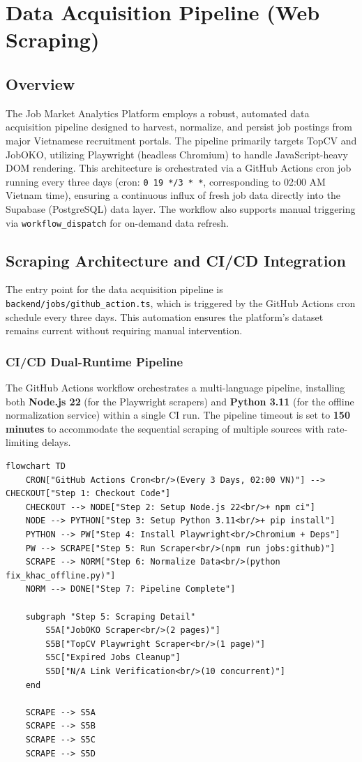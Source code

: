 \chapter{Data Acquisition Pipeline (Web Scraping)}

\section{Overview}
The Job Market Analytics Platform employs a robust, automated data acquisition pipeline designed to harvest, normalize, and persist job postings from major Vietnamese recruitment portals. The pipeline primarily targets TopCV and JobOKO, utilizing Playwright (headless Chromium) to handle JavaScript-heavy DOM rendering. This architecture is orchestrated via a GitHub Actions cron job running every three days (cron: \texttt{0 19 */3 * *}, corresponding to 02:00 AM Vietnam time), ensuring a continuous influx of fresh job data directly into the Supabase (PostgreSQL) data layer. The workflow also supports manual triggering via \texttt{workflow\_dispatch} for on-demand data refresh.

\section{Scraping Architecture and CI/CD Integration}
The entry point for the data acquisition pipeline is \texttt{backend/jobs/github\_action.ts}, which is triggered by the GitHub Actions cron schedule every three days. This automation ensures the platform's dataset remains current without requiring manual intervention.

\subsection{CI/CD Dual-Runtime Pipeline}
The GitHub Actions workflow orchestrates a multi-language pipeline, installing both \textbf{Node.js 22} (for the Playwright scrapers) and \textbf{Python 3.11} (for the offline normalization service) within a single CI run. The pipeline timeout is set to \textbf{150 minutes} to accommodate the sequential scraping of multiple sources with rate-limiting delays.

\begin{verbatim}
flowchart TD
    CRON["GitHub Actions Cron<br/>(Every 3 Days, 02:00 VN)"] --> CHECKOUT["Step 1: Checkout Code"]
    CHECKOUT --> NODE["Step 2: Setup Node.js 22<br/>+ npm ci"]
    NODE --> PYTHON["Step 3: Setup Python 3.11<br/>+ pip install"]
    PYTHON --> PW["Step 4: Install Playwright<br/>Chromium + Deps"]
    PW --> SCRAPE["Step 5: Run Scraper<br/>(npm run jobs:github)"]
    SCRAPE --> NORM["Step 6: Normalize Data<br/>(python fix_khac_offline.py)"]
    NORM --> DONE["Step 7: Pipeline Complete"]
    
    subgraph "Step 5: Scraping Detail"
        S5A["JobOKO Scraper<br/>(2 pages)"]
        S5B["TopCV Playwright Scraper<br/>(1 page)"]
        S5C["Expired Jobs Cleanup"]
        S5D["N/A Link Verification<br/>(10 concurrent)"]
    end
    
    SCRAPE --> S5A
    SCRAPE --> S5B
    SCRAPE --> S5C
    SCRAPE --> S5D
\end{verbatim}

